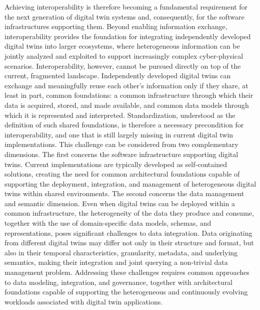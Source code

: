 Achieving interoperability is therefore becoming a fundamental requirement for the next generation of digital twin systems and, consequently, for the software infrastructures supporting them.
%
Beyond enabling information exchange, interoperability provides the foundation for integrating independently developed digital twins into larger ecosystems, where heterogeneous information can be jointly analyzed and exploited to support increasingly complex cyber-physical scenarios.
%
Interoperability, however, cannot be pursued directly on top of the current, fragmented landscape.
%
Independently developed digital twins can exchange and meaningfully reuse each other's information only if they share, at least in part, common foundations: a common infrastructure through which their data is acquired, stored, and made available, and common data models through which it is represented and interpreted.
%
Standardization, understood as the definition of such shared foundations, is therefore a necessary precondition for interoperability, and one that is still largely missing in current digital twin implementations.
%
This challenge can be considered from two complementary dimensions.
%
The first concerns the software infrastructure supporting digital twins. Current implementations are typically developed as self-contained solutions, creating the need for common architectural foundations capable of supporting the deployment, integration, and management of heterogeneous digital twins within shared environments.
%
The second concerns the data management and semantic dimension. Even when digital twins can be deployed within a common infrastructure, the heterogeneity of the data they produce and consume, together with the use of domain-specific data models, schemas, and representations, poses significant challenges to data integration.
%
Data originating from different digital twins may differ not only in their structure and format, but also in their temporal characteristics, granularity, metadata, and underlying semantics, making their integration and joint querying a non-trivial data management problem.
%
Addressing these challenges requires common approaches to data modeling, integration, and governance, together with architectural foundations capable of supporting the heterogeneous and continuously evolving workloads associated with digital twin applications.


